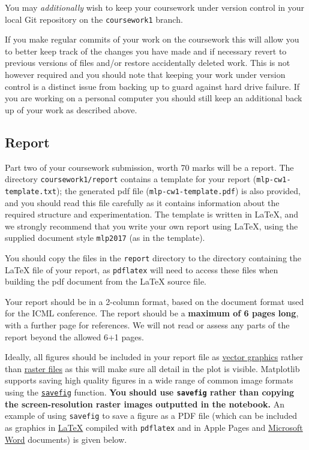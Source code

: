 \documentclass[11pt,]{article}
\begin{document}
You may \emph{additionally} wish to keep your coursework under version
control in your local Git repository on the \texttt{coursework1} branch.

If you make regular commits of your work on the coursework this will
allow you to better keep track of the changes you have made and if
necessary revert to previous versions of files and/or restore
accidentally deleted work. This is not however required and you should
note that keeping your work under version control is a distinct issue
from backing up to guard against hard drive failure. If you are working
on a personal computer you should still keep an additional back up of
your work as described above.

\subsection{Report}
\label{sec:report}

Part two of your coursework submission, worth 70 marks will be a report. The directory
\verb+coursework1/report+ contains a template for your report (\verb+mlp-cw1-template.txt+);  the generated pdf file (\verb+mlp-cw1-template.pdf+) is also provided, and you should read this file carefully as it contains information about the required structure and experimentation. The template is written in LaTeX, and we strongly recommend that you write your own report using LaTeX, using the supplied document style \verb+mlp2017+ (as in the template).

You should copy the files in the \verb+report+ directory to the directory containing the LaTeX file of your report, as \verb+pdflatex+ will need to access these files when building the pdf document from the LaTeX source file.

Your report should be in a 2-column format, based on the document format used for the ICML conference. The report should be a \textbf{maximum of 6 pages long}, with a further page for references.  We will not read or assess any parts of the report beyond the allowed 6+1 pages.  

Ideally, all figures should be included in your report file as
\href{https://en.wikipedia.org/wiki/Vector_graphics}{vector graphics}
rather than \href{https://en.wikipedia.org/wiki/Raster_graphics}{raster
files} as this will make sure all detail in the plot is visible.
Matplotlib supports saving high quality figures in a wide range of
common image formats using the
\href{http://matplotlib.org/api/pyplot_api.html\#matplotlib.pyplot.savefig}{\texttt{savefig}}
function. \textbf{You should use \texttt{savefig} rather than copying
the screen-resolution raster images outputted in the notebook.} An
example of using \texttt{savefig} to save a figure as a PDF file (which
can be included as graphics in
\href{https://en.wikibooks.org/wiki/LaTeX/Importing_Graphics}{LaTeX}
compiled with \texttt{pdflatex} and in Apple Pages and
\href{https://support.office.com/en-us/article/Add-a-PDF-to-your-Office-file-74819342-8f00-4ab4-bcbe-0f3df15ab0dc}{Microsoft
Word} documents) is given below.
\end{document}

